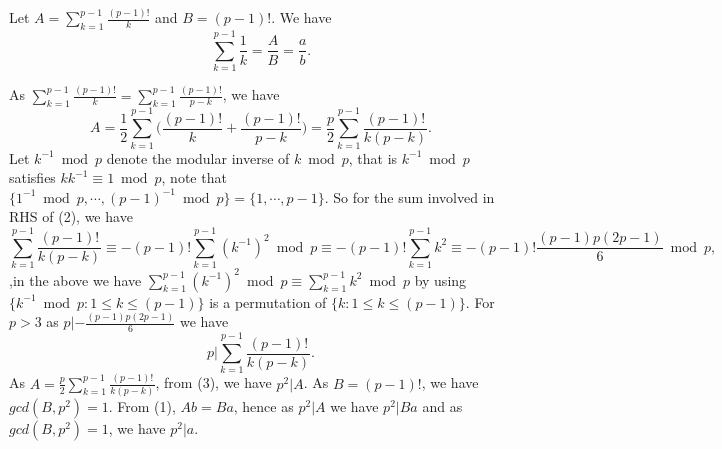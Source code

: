\documentclass{article}
\begin{document}
Let $A=\sum_{k=1}^{p-1}\frac{(p-1)!}{k}$ and $B=(p-1)!$. We have \begin{equation}\sum_{k=1}^{p-1}\frac{1}{k} = \frac{A}{B}=\frac{a}{b}.\end{equation}

As $\sum_{k=1}^{p-1}\frac{(p-1)!}{k} = \sum_{k=1}^{p-1}\frac{(p-1)!}{p-k}$, we have 
\begin{equation}A = \frac{1}{2}\sum_{k=1}^{p-1}\bigg(\frac{(p-1)!}{k}+\frac{(p-1)!}{p-k}\bigg) = \frac{p}{2}\sum_{k=1}^{p-1}\frac{(p-1)!}{k(p-k)}. \end{equation}
Let $k^{-1}\bmod p$ denote the modular inverse of $k\bmod p$, that is $k^{-1}\bmod p$ satisfies $kk^{-1}\equiv 1 \bmod p$, note that $\{1^{-1}\bmod p,\cdots,(p-1)^{-1}\bmod p\} = \{1,\cdots,p-1\}$. So for the sum involved in RHS of (2), we have \[\sum_{k=1}^{p-1}\frac{(p-1)!}{k(p-k)}\equiv -(p-1)!\sum_{k=1}^{p-1}(k^{-1})^2 \bmod p\equiv -(p-1)!\sum_{k=1}^{p-1}k^2 \equiv -(p-1)!\frac{(p-1)p(2p-1)}{6} \bmod p,\],in the above we have $\sum_{k=1}^{p-1}(k^{-1})^2 \bmod p\equiv \sum_{k=1}^{p-1}k^2 \bmod p$ by using $\{k^{-1}\bmod p:1\leq k\leq (p-1)\}$ is a permutation of $\{k:1\leq k\leq (p-1)\}$. For $p>3$ as $p|-\frac{(p-1)p(2p-1)}{6}$ we have \begin{equation} 
     p|\sum_{k=1}^{p-1}\frac{(p-1)!}{k(p-k)}.
    \end{equation}
As $A = \frac{p}{2}\sum_{k=1}^{p-1}\frac{(p-1)!}{k(p-k)}$, from (3), we have $p^2|A$. As $B=(p-1)!$, we have $gcd(B,p^2)=1$. From (1), $Ab = Ba$, hence as $p^2|A$ we have $p^2|Ba$ and as $gcd(B,p^2)=1$, we have $p^2|a$. 
\end{document}
